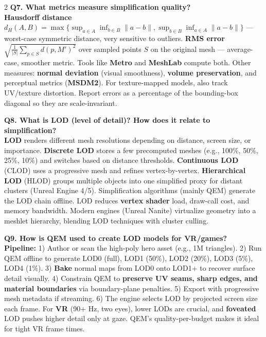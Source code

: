 \begin{paracol}{2}
\textbf{Q7. What metrics measure simplification quality?}\\
\textbf{Hausdorff distance} $d_H(A,B)=\max\{\sup_{a\in A}\inf_{b\in B}\|a-b\|, \sup_{b\in B}\inf_{a\in A}\|a-b\|\}$ — worst-case symmetric distance, very sensitive to outliers. \textbf{RMS error} $\sqrt{\tfrac{1}{|S|}\sum_{p\in S} d(p,M')^2}$ over sampled points $S$ on the original mesh — average-case, smoother metric. Tools like \textbf{Metro} and \textbf{MeshLab} compute both. Other measures: \textbf{normal deviation} (visual smoothness), \textbf{volume preservation}, and perceptual metrics (\textbf{MSDM2}). For texture-mapped models, also track UV/texture distortion. Report errors as a percentage of the bounding-box diagonal so they are scale-invariant.

\textbf{Q8. What is LOD (level of detail)? How does it relate to simplification?}\\
\textbf{LOD} renders different mesh resolutions depending on distance, screen size, or importance. \textbf{Discrete LOD} stores a few precomputed meshes (e.g., 100\%, 50\%, 25\%, 10\%) and switches based on distance thresholds. \textbf{Continuous LOD} (CLOD) uses a progressive mesh and refines vertex-by-vertex. \textbf{Hierarchical LOD} (HLOD) groups multiple objects into one simplified proxy for distant clusters (Unreal Engine 4/5). Simplification algorithms (mainly QEM) generate the LOD chain offline. LOD reduces \textbf{vertex shader} load, draw-call cost, and memory bandwidth. Modern engines (Unreal Nanite) virtualize geometry into a meshlet hierarchy, blending LOD techniques with cluster culling.

\textbf{Q9. How is QEM used to create LOD models for VR/games?}\\
\textbf{Pipeline:} 1) Author or scan the high-poly hero asset (e.g., 1M triangles). 2) Run QEM offline to generate LOD0 (full), LOD1 (50\%), LOD2 (20\%), LOD3 (5\%), LOD4 (1\%). 3) \textbf{Bake} normal maps from LOD0 onto LOD1+ to recover surface detail visually. 4) Constrain QEM to \textbf{preserve UV seams, sharp edges, and material boundaries} via boundary-plane penalties. 5) Export with progressive mesh metadata if streaming. 6) The engine selects LOD by projected screen size each frame. For \textbf{VR} (90+ Hz, two eyes), lower LODs are crucial, and \textbf{foveated} LOD pushes higher detail only at gaze. QEM's quality-per-budget makes it ideal for tight VR frame times.


\end{paracol}

